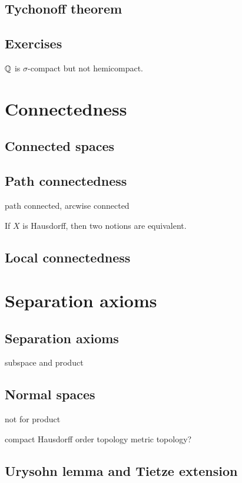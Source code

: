\documentclass{../../large}
\begin{document}
\section{Tychonoff theorem}
\section*{Exercises}
\begin{prb}
$\mathbb{Q}$ is $\sigma$-compact but not hemicompact.
\end{prb}
\chapter{Connectedness}
\section{Connected spaces}
\section{Path connectedness}

path connected, arcwise connected

If $X$ is Hausdorff, then two notions are equivalent.

\section{Local connectedness}



\chapter{Separation axioms}
\section{Separation axioms}
subspace and product


\section{Normal spaces}
not for product

compact Hausdorff
order topology
metric topology?

\section{Urysohn lemma and Tietze extension}
\end{document}
